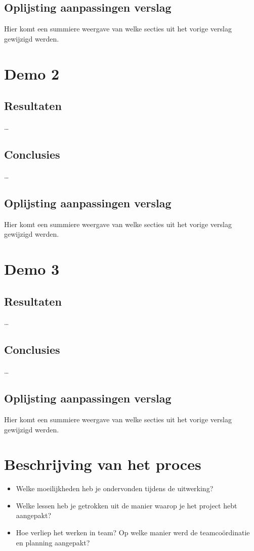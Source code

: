 \documentclass[tt1]{penoverslag}
\begin{document}
\subsection{Oplijsting aanpassingen verslag}
Hier komt een summiere weergave van welke secties uit het vorige verslag gewijzigd werden.


\section{Demo 2}

\subsection{Resultaten}
\ldots

\subsection{Conclusies}
\ldots

\subsection{Oplijsting aanpassingen verslag}
Hier komt een summiere weergave van welke secties uit het vorige verslag gewijzigd werden.


\section{Demo 3}

\subsection{Resultaten}
\ldots

\subsection{Conclusies}
\ldots

\subsection{Oplijsting aanpassingen verslag}
Hier komt een summiere weergave van welke secties uit het vorige verslag gewijzigd werden.


\section{Beschrijving van het proces}
\begin{itemize}
\item Welke moeilijkheden heb je ondervonden tijdens de uitwerking?
\item Welke lessen heb je getrokken uit de manier waarop je het project hebt aangepakt?
\item Hoe verliep het werken in team? Op welke manier werd de teamco\"ordinatie en planning aangepakt?
\end{itemize}
\end{document}
